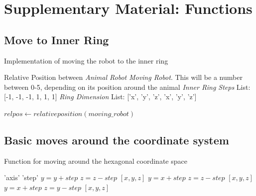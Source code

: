 \newpage
\section{Supplementary Material: Functions}

\subsection{Move to Inner Ring}
\label{function:move to inner ring}
\begin{algorithm}
\caption{Implementation of moving the robot to the inner ring}
 \begin{algorithmic}
\REQUIRE Relative Position between \textit{Animal Robot} \AND \textit{Moving Robot}. This will be a number between 0-5, depending on its position around the animal 
\REQUIRE \textit{Inner Ring Steps} List: [-1, -1, -1, 1, 1, 1]
\REQUIRE \textit{Ring Dimension} List: ['x', 'y', 'z', 'x', 'y', 'z']

\STATE $rel pos \leftarrow relative position(\textit{moving_robot})$

\STATE 


    


 \end{algorithmic}
\end{algorithm}

\subsection{Basic moves around the coordinate system}
\label{function:move_around_hex_grid}
\begin{algorithm}
\caption{Function for moving around the hexagonal coordinate space}
 \begin{algorithmic}
 \REQUIRE 'axis' \AND 'step'
        \STATE$y = y + step$
        \STATE$z = z - step$
        \RETURN $[x, y, z]$
        \STATE$y = x + step$
        \STATE$z = z - step$
        \RETURN $[x, y, z]$
        \STATE$y = x + step$
        \STATE$z = y - step$
        \RETURN $[x, y, z]$
   \ENDIF
 \end{algorithmic}
\end{algorithm}

